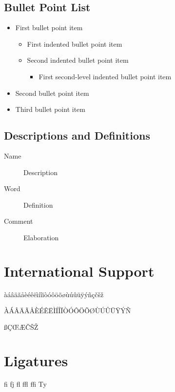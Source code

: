 \documentclass[
	11pt, %
	fleqn, %
	a4paper, %
]{LegrandOrangeBook}
\begin{document}
\subsection{Bullet Point List}

\begin{itemize}
	\item First bullet point item
	\begin{itemize}
		\item First indented bullet point item
		\item Second indented bullet point item
		\begin{itemize}
			\item First second-level indented bullet point item
		\end{itemize}
	\end{itemize}
	\item Second bullet point item
	\item Third bullet point item
\end{itemize}

\subsection{Descriptions and Definitions}

\begin{description}
	\item[Name] Description
	\item[Word] Definition
	\item[Comment] Elaboration
\end{description}


\section{International Support}

àáâäãåèéêëìíîïòóôöõøùúûüÿýñçčšž

\noindent ÀÁÂÄÃÅÈÉÊËÌÍÎÏÒÓÔÖÕØÙÚÛÜŸÝÑ

\noindent ßÇŒÆČŠŽ


\section{Ligatures}

fi fj fl ffl ffi Ty
\end{document}
